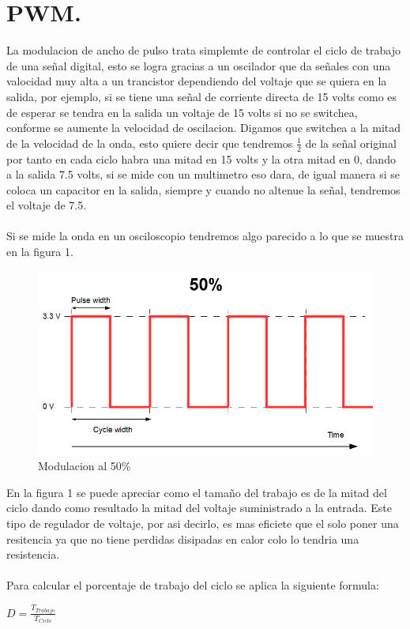 \documentclass[letterpaper]{article}
\begin{document}
\section{PWM.}
    \begin{large}
        La modulacion de ancho de pulso trata simplemte de controlar el ciclo de trabajo de una señal digital, esto se logra gracias a un oscilador que da señales con una valocidad muy alta a un trancistor dependiendo del voltaje que se quiera en la salida, por ejemplo, si se tiene una señal de corriente directa de 15 volts como es de esperar se tendra en la salida un voltaje de 15 volts si no se switchea, conforme se aumente la velocidad de oscilacion. Digamos que switchea a la mitad de la velocidad de la onda, esto quiere decir que tendremos $\frac{1}{2}$ de la señal original por tanto en cada ciclo habra una mitad en 15 volts y la otra mitad en 0, dando a la salida 7.5 volts, si se mide con un multimetro eso dara, de igual manera si se coloca un capacitor en la salida, siempre y cuando no altenue la señal, tendremos el voltaje de 7.5.\\\\
        Si se mide la onda en un osciloscopio tendremos algo parecido a lo que se muestra en la figura 1.
        \begin{figure}[htbp]
            \centering
            \includegraphics[scale=0.5]{IMG/50.png}
            \caption{Modulacion al 50\%}
            \label{fig:50per}
        \end{figure}
        En la figura 1 se puede apreciar como el tamaño del trabajo es de la mitad del ciclo dando como resultado la mitad del voltaje suministrado a la entrada.
        Este tipo de regulador de voltaje, por asi decirlo, es mas eficiete que el solo poner una resitencia ya que no tiene perdidas disipadas en calor colo lo tendria una resistencia.\\\\
        Para calcular el porcentaje de trabajo del ciclo se aplica la siguiente formula:\\
        \begin{center}
            $D=\frac{T_{Trabajo}}{T_{Ciclo}}$
        \end{center}
    \end{large}
\end{document}
